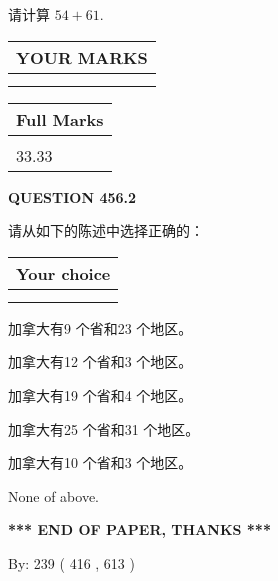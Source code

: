 \documentclass{ctexart}
\begin{document}
  
 
请计算 $ %
54 +  %
61 $.
 

 

 
  
\vspace{0.2in}
  
\noindent\begin{tabular}{|l|}
\hline
 YOUR MARKS  \\
\hline
 \\ 
 \\ 
\hline
\end{tabular}
\hspace{0.05in} \begin{tabular}{|l|}
\hline
 Full Marks  \\
\hline
 \\ 
33.33 \\
\hline
\end{tabular}
{\textbf{\Large{QUESTION
456.2 
}}}
  
  
请从如下的陈述中选择正确的：
  
  
\noindent\hspace{3.0in} \begin{tabular}{|l|}
\hline
Your choice \\
\hline
 \\ 
 \\ 
\hline
\end{tabular}
  
  
 
 
加拿大有9 个省和23 个地区。
 
 
加拿大有12 个省和3 个地区。
 
 
加拿大有19 个省和4 个地区。
 
 
加拿大有25 个省和31 个地区。
 
 
加拿大有10 个省和3 个地区。
 
 
 None of above.
 
 
   
   
 \vspace{0.2in}
 
   
   
   
   
\vspace{1.0in} 
{\textbf{\large{ *** END OF PAPER, THANKS *** }}} 
   
   
\hspace{1.0in} By: 
 239 ( 416 ,  613 )
   
\end{document}
